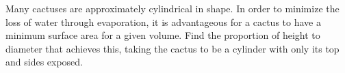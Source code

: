 Many cactuses are approximately cylindrical in shape. In order
to minimize the loss of water through evaporation, it is
advantageous for a cactus to have a minimum surface area
for a given volume. Find the proportion
of height to diameter that achieves this, taking the cactus
to be a cylinder with only its top and sides exposed.\answercheck
